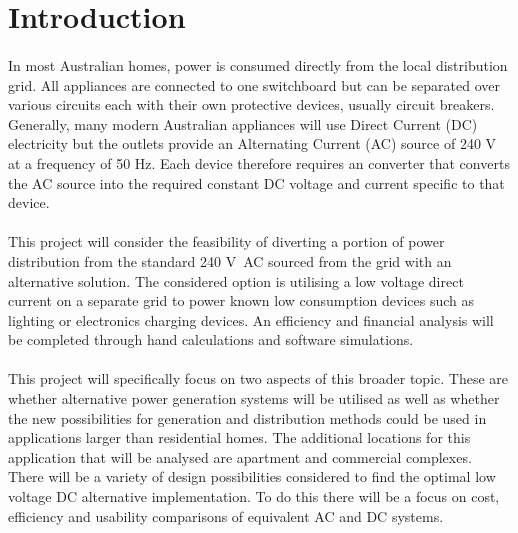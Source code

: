 
\section{Introduction}

\paragraph{} 
In most Australian homes, power is consumed directly from the local distribution grid. All appliances are connected to one switchboard but can be separated over various circuits each with their own protective devices, usually circuit breakers. Generally, many modern Australian appliances will use Direct Current (DC) electricity but the outlets provide an Alternating Current (AC) source of 240 \si{V} at a frequency of 50 \si{Hz}. Each device therefore requires an converter that converts the AC source into the required constant DC voltage and current specific to that device. 

\paragraph{} 
This project will consider the feasibility of diverting a portion of power distribution from the standard 240 \si{V AC} sourced from the grid with an alternative solution. The considered option is utilising a low voltage direct current on a separate grid to power known low consumption devices such as lighting or electronics charging devices. An efficiency and financial analysis will be completed through hand calculations and software simulations.  

\paragraph{} 
This project will specifically focus on two aspects of this broader topic. These are whether alternative power generation systems will be utilised as well as whether the new possibilities for generation and distribution methods could be used in applications larger than residential homes. The additional locations for this application that will be analysed are apartment and commercial complexes. There will be a variety of design possibilities considered to find the optimal low voltage DC alternative implementation. To do this there will be a focus on cost, efficiency and usability comparisons of equivalent AC and DC systems.   

\newpage